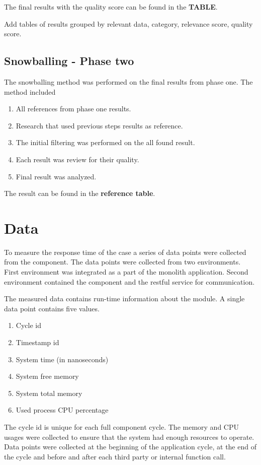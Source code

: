 The final results with the quality score can be found in the \textbf{TABLE}.

Add tables of results grouped by relevant data, category, relevance score, quality score.

\subsection{Snowballing - Phase two}
The snowballing method was performed on the final results from phase one.
The method included 
\begin{enumerate}
    \item All references from phase one results.
    \item Research that used previous steps results as reference.
    \item The initial filtering was performed on the all found result.
    \item Each result was review for their quality.
    \item Final result was analyzed. 
\end{enumerate}

The result can be found in the \textbf{reference table}.

\section{Data}
To measure the response time of the case a series of data points were collected from the component.
The data points were collected from two environments.
First environment was integrated as a part of the monolith application.
Second environment contained the component and the restful service for communication.

The measured data contains run-time information about the module.
A single data point contains five values.
\begin{enumerate}
    \item Cycle id
    \item Timestamp id
    \item System time (in nanoseconds)
    \item System free memory
    \item System total memory
    \item Used process CPU percentage
\end{enumerate}

The cycle id is unique for each full component cycle.
The memory and CPU usages were collected to ensure that the system had enough resources to operate.
Data points were collected at the beginning of the application cycle, at the end of the cycle and before and after each third party or internal function call.

